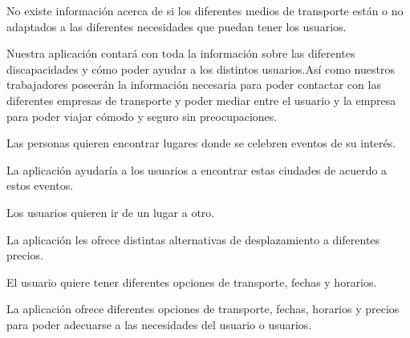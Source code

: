 \vspace{0.5cm}

\begin{problema}

      No existe información acerca de si los diferentes medios de transporte están o
      no adaptados a las diferentes necesidades que puedan tener los usuarios.

            {\centering
                  \begin{vision}\justifying\noindent
                        Nuestra aplicación contará con toda la información sobre las diferentes discapacidades y cómo poder ayudar a los distintos usuarios.Así como nuestros trabajadores poseerán la información necesaria para poder contactar con las diferentes empresas de transporte y poder mediar entre el usuario y la empresa para poder viajar cómodo y seguro sin preocupaciones.

                  \end{vision}}
\end{problema}

\vspace{0.5cm}

\begin{problema}

      Las personas quieren encontrar lugares donde se celebren eventos de su interés.

      {\centering
      \begin{vision}\justifying\noindent
            La aplicación ayudaría a los usuarios a encontrar estas ciudades de acuerdo a estos eventos.
      \end{vision}}
\end{problema}

\vspace{0.5cm}

\begin{problema}

      Los usuarios quieren ir de un lugar a otro.

            {\centering
                  \begin{vision}\justifying\noindent
                        La aplicación les ofrece distintas alternativas de desplazamiento a diferentes precios.
                  \end{vision}}
\end{problema}

\vspace{0.5cm}

\begin{problema}

      El usuario quiere tener diferentes opciones de transporte, fechas y horarios.

            {\centering
                  \begin{vision}\justifying\noindent
                        La aplicación ofrece diferentes opciones de transporte, fechas, horarios y precios para poder adecuarse a las necesidades del usuario o usuarios.
                  \end{vision}}
\end{problema}

